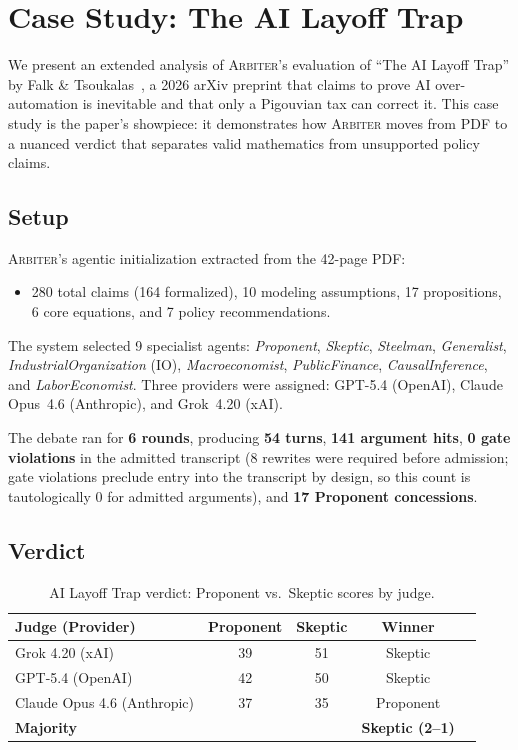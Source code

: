 \documentclass[11pt]{article}
\newcommand{\arbiter}{\textsc{Arbiter}}
\begin{document}
\section{Case Study: The AI Layoff Trap}
\label{sec:casestudy}

We present an extended analysis of \arbiter{}'s evaluation of ``The AI Layoff Trap'' by Falk \& Tsoukalas~\cite{falk2026}, a 2026 arXiv preprint that claims to prove AI over-automation is inevitable and that only a Pigouvian tax can correct it.
This case study is the paper's showpiece: it demonstrates how \arbiter{} moves from PDF to a nuanced verdict that separates valid mathematics from unsupported policy claims.

\subsection{Setup}

\arbiter{}'s agentic initialization extracted from the 42-page PDF:
\begin{itemize}[leftmargin=*,itemsep=1pt]
\item 280 total claims (164 formalized), 10 modeling assumptions, 17 propositions, 6 core equations, and 7 policy recommendations.
\end{itemize}

The system selected 9 specialist agents:
\emph{Proponent}, \emph{Skeptic}, \emph{Steelman}, \emph{Generalist}, \emph{IndustrialOrganization} (IO), \emph{Macroeconomist}, \emph{PublicFinance}, \emph{CausalInference}, and \emph{LaborEconomist}.
Three providers were assigned: GPT-5.4 (OpenAI), Claude Opus~4.6 (Anthropic), and Grok~4.20 (xAI).

The debate ran for \textbf{6 rounds}, producing \textbf{54 turns}, \textbf{141 argument hits}, \textbf{0 gate violations} in the admitted transcript (8 rewrites were required before admission; gate violations preclude entry into the transcript by design, so this count is tautologically 0 for admitted arguments), and \textbf{17 Proponent concessions}.


\subsection{Verdict}

\begin{table}[t]
\centering
\caption{AI Layoff Trap verdict: Proponent vs.\ Skeptic scores by judge.}
\label{tab:verdict}
\begin{tabular}{@{}lcccl@{}}
\toprule
\textbf{Judge (Provider)} & \textbf{Proponent} & \textbf{Skeptic} & \textbf{Winner} \\
\midrule
Grok 4.20 (xAI) & 39 & 51 & Skeptic \\
GPT-5.4 (OpenAI) & 42 & 50 & Skeptic \\
Claude Opus 4.6 (Anthropic) & 37 & 35 & Proponent \\
\midrule
\textbf{Majority} & & & \textbf{Skeptic (2--1)} \\
\bottomrule
\end{tabular}
\end{table}
\end{document}
